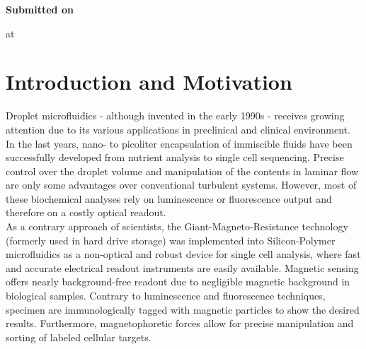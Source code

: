 \textbf{Submitted on}\tab 
\begin{minipage}[t]{\textwidth-\CurrentLineWidth}
	\Datum{} at \Ort{}\strut
\end{minipage}

\newpage\null\thispagestyle{empty}\newpage
\newpage\null\thispagestyle{empty}\newpage



\pagestyle{empty}
\renewcommand*\chapterpagestyle{empty}
\tableofcontents%
\clearpage
\pagestyle{headings}
\renewcommand*\chapterpagestyle{headings}

\newpage\null\thispagestyle{empty}\newpage

\chapter{Introduction and Motivation}
\setcounter{page}{1}
Droplet microfluidics - although invented in the early 1990s - receives growing attention due to its various applications in preclinical and clinical environment. In the last years, nano- to picoliter encapsulation of immiscible fluids have been successfully developed  from nutrient analysis to single cell sequencing. Precise control over the droplet volume and manipulation of the contents in laminar flow are only some advantages over conventional turbulent systems. However, most of these biochemical analyses rely on luminescence or fluorescence output and therefore on a costly optical readout.\\
As a contrary approach of scientists, the Giant-Magneto-Resistance technology (formerly used in hard drive storage) was implemented into Silicon-Polymer microfluidics as a non-optical and robust device for single cell analysis, where fast and accurate electrical readout instruments are easily available. Magnetic sensing offers nearly background-free readout due to negligible magnetic background in biological samples. Contrary to luminescence and fluorescence techniques, specimen are immunologically tagged with magnetic particles to show the desired results. Furthermore, magnetophoretic forces allow for precise manipulation and sorting of   labeled cellular targets. \\
